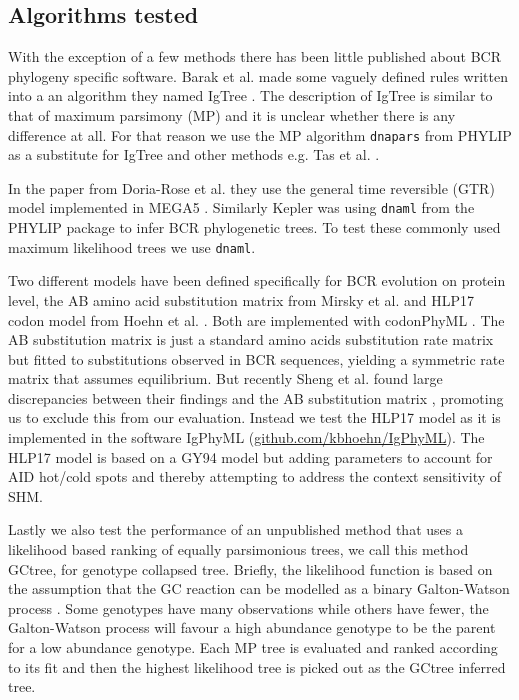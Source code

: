 \subsection{Algorithms tested}
With the exception of a few methods there has been little published about BCR phylogeny specific software.
Barak et al. made some vaguely defined rules written into a an algorithm they named IgTree \cite{Barak2008-fw}.
The description of IgTree is similar to that of maximum parsimony (MP) and it is unclear whether there is any difference at all.
For that reason we use the MP algorithm \texttt{dnapars} from PHYLIP \cite{plotree1989phylip} as a substitute for IgTree and other methods e.g. Tas et al. \cite{tas2016visualizing}.

In the paper from Doria-Rose et al. \cite{Doria-Rose2014-vi} they use the general time reversible (GTR) model implemented in MEGA5 \cite{tamura2011mega5}.
Similarly Kepler \cite{Kepler2013-sy} was using \texttt{dnaml} from the PHYLIP package to infer BCR phylogenetic trees.
To test these commonly used maximum likelihood trees we use \texttt{dnaml}.

Two different models have been defined specifically for BCR evolution on protein level, the AB amino acid substitution matrix from Mirsky et al. \cite{mirsky2014antibody} and HLP17 codon model from Hoehn et al. \cite{Hoehn2016-wg}.
Both are implemented with codonPhyML \cite{gil2013codonphyml}.
The AB substitution matrix is just a standard amino acids substitution rate matrix but fitted to substitutions observed in BCR sequences, yielding a symmetric rate matrix that assumes equilibrium.
But recently Sheng et al. found large discrepancies between their findings and the AB substitution matrix \cite{sheng2017gene}, promoting us to exclude this from our evaluation.
Instead we test the HLP17 model as it is implemented in the software IgPhyML (\url{github.com/kbhoehn/IgPhyML}).
The HLP17 model is based on a GY94 model \cite{goldman1994codon} but adding parameters to account for AID hot/cold spots and thereby attempting to address the context sensitivity of SHM. 

Lastly we also test the performance of an unpublished method that uses a likelihood based ranking of equally parsimonious trees, we call this method GCtree, for genotype collapsed tree.
Briefly, the likelihood function is based on the assumption that the GC reaction can be modelled as a binary Galton-Watson process \cite{harris2002theory}.
Some genotypes have many observations while others have fewer, the Galton-Watson process will favour a high abundance genotype to be the parent for a low abundance genotype.
Each MP tree is evaluated and ranked according to its fit and then the highest likelihood tree is picked out as the GCtree inferred tree.



